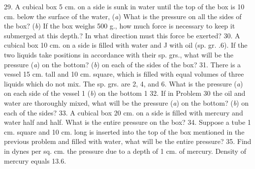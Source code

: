 29. A cubical box 5 cm. on a side is sunk in water until the top of the box is 10 cm. below the surface of the water, (\emph{a}) What is the pressure on all the sides of the box? (\emph{b}) If the box weighs 500 g., how much force is necessary to keep it submerged at this depth.? In what direction must this force be exerted?
30. A cubical box 10 cm. on a side is filled \frac{}{} with water and J with oil (sp. gr. .6). If the two liquids take positions in accordance with their sp. grs., what will be the pressure (\emph{a}) on the bottom? (\emph{b}) on each of the sides of the box?
31. There is a vessel 15 cm. tall and 10 cm. square, which is filled with equal volumes of three liquids which do not mix. The sp. grs. are 2, 4, and 6. What is the pressure (\emph{a}) on each side of the vessel 1 (\emph{b}) on the bottom 1
32. If in Problem 30 the oil and water are thoroughly mixed, what will be the pressure (\emph{a}) on the bottom? (\emph{b}) on each of the sides?
33. A cubical box 20 cm. on a side is filled with mercury and water half and half. What is the entire pressure on the box?
34. Suppose a tube 1 cm. square and 10 cm. long is inserted into the top of the box mentioned in the previous problem and filled with water, what will be the entire pressure?
35. Find in dynes per sq. cm. the pressure due to a depth of 1 cm. of mercury. Density of mercury equals 13.6.